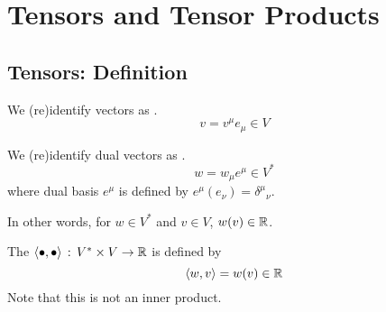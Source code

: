 \documentclass[a4paper, 10pt]{article}
\begin{document}

\section{Tensors and Tensor Products}

\subsection{Tensors: Definition}

\begin{definition}[(1,0)-tensors]
    We (re)identify vectors as .
    \[ v = v^{\mu}e_{\mu} \in V \]
\end{definition}
\begin{definition}[(0,1)-tensors]
    We (re)identify dual vectors as .
    \[ w = w_{\mu}e^{\mu} \in V^{\ast} \]
    where dual basis $e^{\mu}$ is defined by $e^{\mu}(e_{\nu}) = \delta^{\mu}{}_{\nu}$.
\end{definition}
In other words, for $w \in V^{\ast}$ and $v \in V$, $w(v) \in \mathbb{R}$.
\begin{definition}
    The  $\left< \bullet , \bullet \right> \,:\, V^{\ast} \times V \rightarrow \mathbb{R}$ is defined by
    \[ \left<w, v\right> = w(v) \in \mathbb{R} \]
    Note that this is not an inner product.
\end{definition}

\seprule
\end{document}
